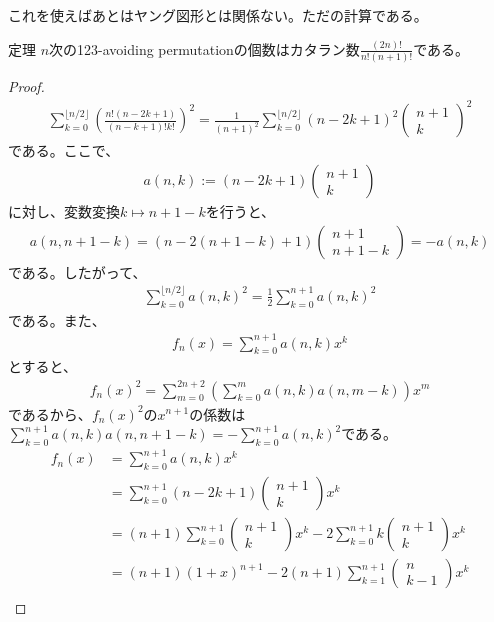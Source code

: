 \documentclass[a4paper,11pt]{jsarticle}
\theoremstyle{plain}
\theoremstyle{definition}
\renewcommand{\(}{\left(}
\renewcommand{\)}{\right)}
\renewcommand{\[}{\left[}
\renewcommand{\]}{\right]}
\renewcommand{\{}{\left\lbrace}
\renewcommand{\}}{\right\rbrace}
\newcommand{\pmat}[1]{\begin{pmatrix} #1 \end{pmatrix}}
\begin{document}
これを使えばあとはヤング図形とは関係ない。ただの計算である。

\begin{itembox}[l]{定理}
    $n$次の123-avoiding permutationの個数はカタラン数$\displaystyle \frac{(2n)!}{n!(n+1)!}$である。
\end{itembox}


\begin{proof}
    \begin{align*}
        \sum_{k=0}^{\lfloor n/2 \rfloor} \(\frac{n! (n-2k+1)}{(n-k+1)! k!}\)^2 = \frac{1}{(n+1)^2} \sum_{k=0}^{\lfloor n/2 \rfloor} (n-2k+1)^2 \pmat{n+1 \\ k}^2
    \end{align*}
    である。ここで、
    \begin{align*}
        a(n,k) := (n-2k+1) \pmat{n+1 \\ k}
    \end{align*}
    に対し、変数変換$k \mapsto n+1-k$を行うと、
    \begin{align*}
        a(n,n+1-k) = (n-2(n+1-k)+1) \pmat{n+1 \\ n+1-k} = - a(n,k)
    \end{align*}
    である。したがって、
    \begin{align*}
        \sum_{k=0}^{\lfloor n/2 \rfloor} a(n,k)^2 = \frac{1}{2} \sum_{k=0}^{n+1} a(n,k)^2
    \end{align*}
    である。また、
    \begin{align*}
        f_n(x) = \sum_{k=0}^{n+1} a(n,k) x^k
    \end{align*}
    とすると、
    \begin{align*}
        f_n(x)^2 = \sum_{m=0}^{2n+2}\( \sum_{k=0}^{m} a(n,k) a(n,m-k)\) x^m
    \end{align*}
    であるから、$f_n(x)^2$の$x^{n+1}$の係数は$\displaystyle \sum_{k=0}^{n+1} a(n,k) a(n,n+1-k) = - \sum_{k=0}^{n+1} a(n,k)^2$である。
    \begin{align*}
        f_n(x) &= \sum_{k=0}^{n+1} a(n,k) x^k \\
        &= \sum_{k=0}^{n+1} (n-2k+1) \pmat{n+1 \\ k} x^k \\
        &= (n+1) \sum_{k=0}^{n+1} \pmat{n+1 \\ k} x^k - 2 \sum_{k=0}^{n+1} k \pmat{n+1 \\ k} x^k \\
        &= (n+1) (1+x)^{n+1} - 2(n+1) \sum_{k=1}^{n+1} \pmat{n \\ k-1} x^k \\

\end{align*}
\end{proof}
\end{document}
